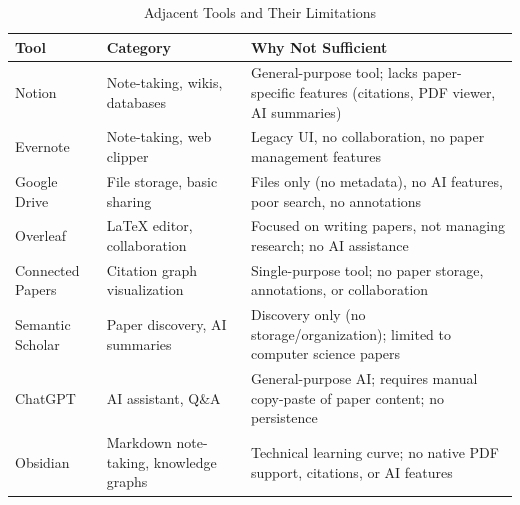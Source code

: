 \begin{table}[H]
    \centering
    \small
    \begin{tabular}{|l|p{5cm}|p{5cm}|}
        \hline
        \textbf{Tool}                          & \textbf{Category} & \textbf{Why Not Sufficient}  \\
        \hline
        Notion                                 &
        Note-taking, wikis, databases          &
        General-purpose tool; lacks paper-specific features (citations, PDF viewer, AI summaries) \\
        \hline
        Evernote                               &
        Note-taking, web clipper               &
        Legacy UI, no collaboration, no paper management features                                 \\
        \hline
        Google Drive                           &
        File storage, basic sharing            &
        Files only (no metadata), no AI features, poor search, no annotations                     \\
        \hline
        Overleaf                               &
        LaTeX editor, collaboration            &
        Focused on writing papers, not managing research; no AI assistance                        \\
        \hline
        Connected Papers                       &
        Citation graph visualization           &
        Single-purpose tool; no paper storage, annotations, or collaboration                      \\
        \hline
        Semantic Scholar                       &
        Paper discovery, AI summaries          &
        Discovery only (no storage/organization); limited to computer science papers              \\
        \hline
        ChatGPT                                &
        AI assistant, Q\&A                     &
        General-purpose AI; requires manual copy-paste of paper content; no persistence           \\
        \hline
        Obsidian                               &
        Markdown note-taking, knowledge graphs &
        Technical learning curve; no native PDF support, citations, or AI features                \\
        \hline
    \end{tabular}
    \caption{Adjacent Tools and Their Limitations}
    \label{table:adjacent-tools}
\end{table}

